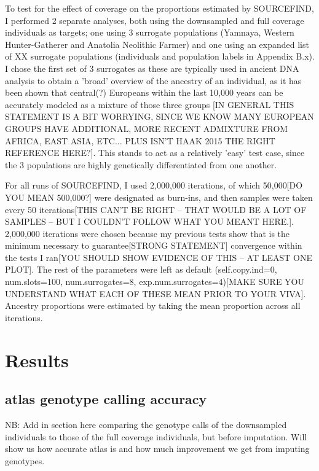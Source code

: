 To test for the effect of coverage on the proportions estimated by SOURCEFIND, I performed 2 separate analyses, both using the downsampled and full coverage individuals as targets; one using 3 surrogate populations (Yamnaya, Western Hunter-Gatherer and Anatolia Neolithic Farmer) and one using an expanded list of {\color{red}XX} surrogate populations (individuals and population labels in Appendix B.x). I chose the first set of 3 surrogates as these are typically used in ancient DNA analysis to obtain a 'broad' overview of the ancestry of an individual, as it has been shown that {\color{red}central(?)} Europeans within the last 10,000 years can be accurately modeled as a mixture of those three groups \cite{Lazaridis2014}{\color{red}[IN GENERAL THIS STATEMENT IS A BIT WORRYING, SINCE WE KNOW MANY EUROPEAN GROUPS HAVE ADDITIONAL, MORE RECENT ADMIXTURE FROM AFRICA, EAST ASIA, ETC... PLUS ISN'T HAAK 2015 THE RIGHT REFERENCE HERE?]}. This stands to act as a relatively 'easy' test case, since the 3 populations are highly genetically differentiated from one another.

For all runs of SOURCEFIND, I used 2,000,000 iterations, of which {\color{red}50,000[DO YOU MEAN 500,000?]} were designated as burn-ins, and {\color{red}then samples were taken every 50 iterations[THIS CAN'T BE RIGHT -- THAT WOULD BE A LOT OF SAMPLES -- BUT I COULDN'T FOLLOW WHAT YOU MEANT HERE.]}. 2,000,000 iterations {\color{red}were} chosen because my previous tests show that is the minimum necessary to {\color{red}guarantee[STRONG STATEMENT]} convergence within the tests I ran{\color{red}[YOU SHOULD SHOW EVIDENCE OF THIS -- AT LEAST ONE PLOT]}. The rest of the parameters were left as default (self.copy.ind=0, num.slots=100, num.surrogates=8, exp.num.surrogates=4){\color{red}[MAKE SURE YOU UNDERSTAND WHAT EACH OF THESE MEAN PRIOR TO YOUR VIVA]}. Ancestry proportions were estimated by taking the mean proportion across all iterations. 

\section{Results}

\subsection{atlas genotype calling accuracy}

NB: Add in section here comparing the genotype calls of the downsampled individuals to those of the full coverage individuals, but before imputation. Will show us how accurate atlas is and how much improvement we get from imputing genotypes.  

